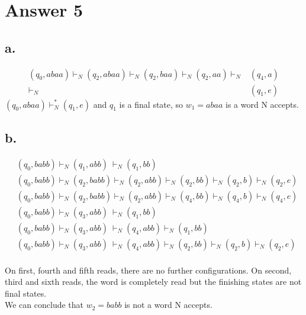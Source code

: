 \documentclass[12pt]{article}
\begin{document}
\section*{Answer 5}

\subsection*{a.}

\begin{align*}
  (q_0, abaa) \vdash_N (q_2, abaa) \vdash_N (q_2, baa) \vdash_N (q_2, aa) \vdash_N & (q_4, a)\\
                                                                          \vdash_N & (q_1, e)
\end{align*}
$(q_0, abaa) \vdash^*_N (q_1, e)$ and $q_1$ is a final state, so $w_1 = abaa$ is a word N accepts.

\subsection*{b.}

\begin{align}
&(q_0, babb) \vdash_N (q_1, abb) \ \vdash_N (q_1, bb)\\
&(q_0, babb) \vdash_N (q_2, babb)  \vdash_N (q_2, abb) \vdash_N (q_2, bb) \vdash_N (q_2, b) \vdash_N (q_2, e)\\
&(q_0, babb) \vdash_N (q_2, babb)  \vdash_N (q_2, abb) \vdash_N (q_4, bb) \vdash_N (q_4, b) \vdash_N (q_4, e)\\
&(q_0, babb) \vdash_N (q_3, abb) \ \vdash_N (q_1, bb)\\
&(q_0, babb) \vdash_N (q_3, abb) \ \vdash_N (q_4, abb) \vdash_N (q_1, bb)\\
&(q_0, babb) \vdash_N (q_3, abb) \ \vdash_N (q_4, abb) \vdash_N (q_2, bb) \vdash_N (q_2, b) \vdash_N (q_2, e)
\end{align}\\

\qquad On first, fourth and fifth reads, there are no further configurations. On second, third and sixth reads, the word is completely read but the finishing states are not final states.\\

\qquad We can conclude that $w_2 = babb$ is not a word N accepts.
\end{document}
